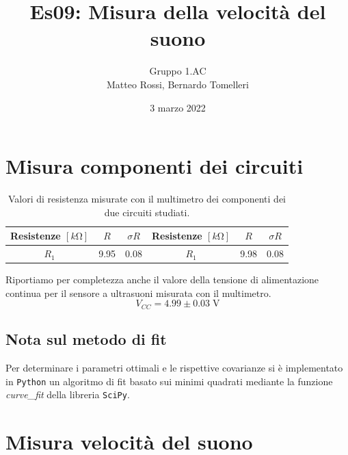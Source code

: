 \documentclass[10pt, a4paper, italian]{article}
\author{Gruppo 1.AC \\ Matteo Rossi, Bernardo Tomelleri}
\title{Es09: Misura della velocità del suono}
\begin{document}
\date{3 marzo 2022}
\maketitle

\setcounter{section}{0}

\section*{Misura componenti dei circuiti}
\begin{table}[htbp]
\centering
\begin{tabular}{ccc|ccc}
\toprule
Resistenze $[\si{k\ohm}]$ & $R$ & $\sigma R$ & Resistenze $[\si{k\ohm}]$ & $R$ &
$\sigma R$ \\
\midrule
\midrule
$R_1$	  	& 9.95 	& 0.08		& $R_1$ & 9.98	& 0.08 \\
\bottomrule
\end{tabular}
\caption{Valori di resistenza misurate con il multimetro dei componenti dei
due circuiti studiati. \label{tab: rcmes_B}}
\end{table}

Riportiamo per completezza anche il valore della tensione di alimentazione
continua per il sensore a ultrasuoni misurata con il multimetro.
\[
V_{CC} = 4.99 \pm 0.03 \; \si{\V}
\]

\subsection*{Nota sul metodo di fit}
Per determinare i parametri ottimali e le rispettive covarianze si \`e
implementato in \verb+Python+ un algoritmo di fit basato sui minimi quadrati
mediante la funzione \emph{curve\_fit} della libreria \texttt{SciPy}.

\section{Misura velocità del suono}
\end{document}
